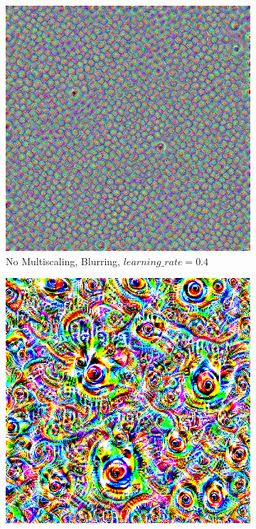 \newpage
\begin{figure}
    \captionsetup{justification=centering}
    
    \begin{subfigure}[t]{0.31\textwidth}
        \captionsetup{justification=centering}
        \centering
        \includegraphics[width=.7\linewidth]{figuras/feat_vis/experiments/layers/intermediary/l9/random_image_pl1_lr4e-1_layer19.png}
        \caption{No Multiscaling, Blurring, \(learning\_rate = 0.4\)}
    \end{subfigure}
    \hfill
    \begin{subfigure}[t]{0.31\textwidth}
        \captionsetup{justification=centering}
        \centering
        \includegraphics[width=.7\linewidth]{figuras/feat_vis/experiments/layers/intermediary/l9/random_image_pl4_lr4e-1_layer19_no-blur.png}

\end{subfigure}
\end{figure}
